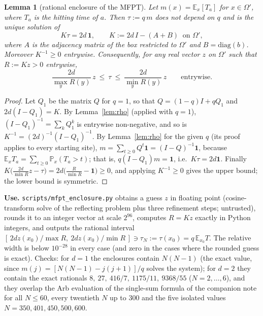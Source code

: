 \documentclass[11pt,a4paper]{article}
\newtheorem{lemma}[theorem]{Lemma}
\theoremstyle{definition}
\theoremstyle{remark}
\begin{document}
\begin{lemma}[rational enclosure of the MFPT]\label{lem:mfpt}
Let $m(x)=\mathbb E_x[T_a]$ for $x\in\Omega'$, where $T_a$ is the hitting time of $a$. Then $\tau:=q\,m$ does not depend on $q$ and is the unique solution of
\[
K\tau=2d\,\mathbf 1,\qquad K:=2d\,I-(A+B)\ \text{ on }\Omega',
\]
where $A$ is the adjacency matrix of the box restricted to $\Omega'$ and $B=\mathrm{diag}(b)$. Moreover $K^{-1}\ge0$ entrywise. Consequently, for \emph{any} real vector $z$ on $\Omega'$ such that $R:=Kz>0$ entrywise,
\[
\frac{2d}{\max_yR(y)}\,z\ \le\ \tau\ \le\ \frac{2d}{\min_yR(y)}\,z\qquad\text{entrywise.}
\]
\end{lemma}
\begin{proof}
Let $Q_1$ be the matrix $Q$ for $q=1$, so that $Q=(1-q)I+qQ_1$ and $2d(I-Q_1)=K$. By Lemma~\ref{lem:rho} (applied with $q=1$), $(I-Q_1)^{-1}=\sum_kQ_1^k$ is entrywise non-negative, and so is $K^{-1}=(2d)^{-1}(I-Q_1)^{-1}$. By Lemma~\ref{lem:rho} for the given $q$ (its proof applies to every starting site), $m=\sum_{t\ge0}Q^t\mathbf 1=(I-Q)^{-1}\mathbf 1$, because $\mathbb E_xT_a=\sum_{t\ge0}\mathbb P_x(T_a>t)$; that is, $q(I-Q_1)m=\mathbf 1$, i.e.\ $K\tau=2d\mathbf 1$. Finally $K\bigl(\tfrac{2d}{\min R}z-\tau\bigr)=2d\bigl(\tfrac{R}{\min R}-\mathbf 1\bigr)\ge0$, and applying $K^{-1}\ge0$ gives the upper bound; the lower bound is symmetric.
\end{proof}

\textbf{Use.} \texttt{scripts/mfpt\_enclosure.py} obtains a guess $z$ in floating point (cosine-transform solve of the reflecting problem plus three refinement steps; untrusted), rounds it to an integer vector at scale $2^{96}$, computes $R=Kz$ exactly in Python integers, and outputs the rational interval $[\,2dz(x_0)/\max R,\ 2dz(x_0)/\min R\,]\ni\tau_N:=\tau(x_0)=q\,\mathbb E_{x_0}T$. The relative width is below $10^{-28}$ in every case (and zero in the cases where the rounded guess is exact). Checks: for $d=1$ the enclosures contain $N(N-1)$ (the exact value, since $m(j)=[N(N-1)-j(j+1)]/q$ solves the system); for $d=2$ they contain the exact rationals $8,\ 27,\ 416/7,\ 1175/11,\ 9368/55$ ($N=2,\dots,6$), and they overlap the Arb evaluation of the single-sum formula of the companion note for all $N\le60$, every twentieth $N$ up to $300$ and the five isolated values $N=350,401,450,500,600$.
\end{document}
